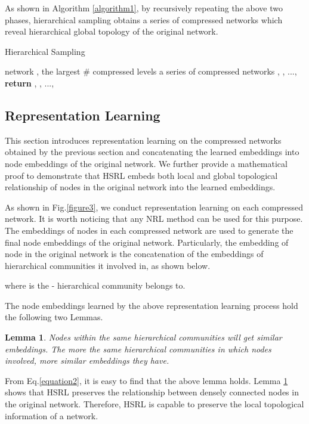 \documentclass[conference]{IEEEtran}
\begin{document}
As shown in Algorithm \ref{algorithm1}, by recursively repeating the above two phases, hierarchical sampling obtains a series of compressed networks which reveal hierarchical global topology of the original network. 

\begin{algorithm}
	\renewcommand{\algorithmicrequire}{\textbf{Input:}}
	\renewcommand{\algorithmicensure}{\textbf{Output:}}
	\caption{Hierarchical Sampling}
	\label{algorithm1}
	\begin{algorithmic}[1]
		\REQUIRE network , the largest \# compressed levels 
		\ENSURE a series of compressed networks , , ..., 
		\STATE 
		\FOR{}
		\STATE 
		\STATE 
		\STATE 
		\ENDFOR
		\STATE \textbf{return} , , ..., 
	\end{algorithmic}  
\end{algorithm}

\subsection{Representation Learning}
This section introduces representation learning on the compressed networks obtained by the previous section and concatenating the learned embeddings into node embeddings of the original network. We further provide a mathematical proof to demonstrate that HSRL embeds both local and global topological relationship of nodes in the original network into the learned embeddings.  

As shown in Fig.\ref{figure3}, we conduct representation learning on each compressed network. It is worth noticing that any NRL method can be used for this purpose. The embeddings of nodes in each compressed network are used to generate the final node embeddings of the original network. Particularly, the embedding  of node  in the original network  is the concatenation of the embeddings of hierarchical communities it involved in, as shown below.


\noindent where  is the - hierarchical community  belongs to.

The node embeddings learned by the above representation learning process hold the following two Lemmas.

\newtheorem{myprop}{Lemma}
\begin{myprop}\label{lemma1}
    Nodes within the same hierarchical communities will get similar embeddings. The more the same hierarchical communities in which nodes involved, more similar embeddings they have.
\end{myprop}
From Eq.\ref{equation2}, it is easy to find that the above lemma holds. Lemma \ref{lemma1} shows that HSRL preserves the relationship between densely connected nodes in the original network. Therefore, HSRL is capable to preserve the local topological information of a network.
\end{document}
